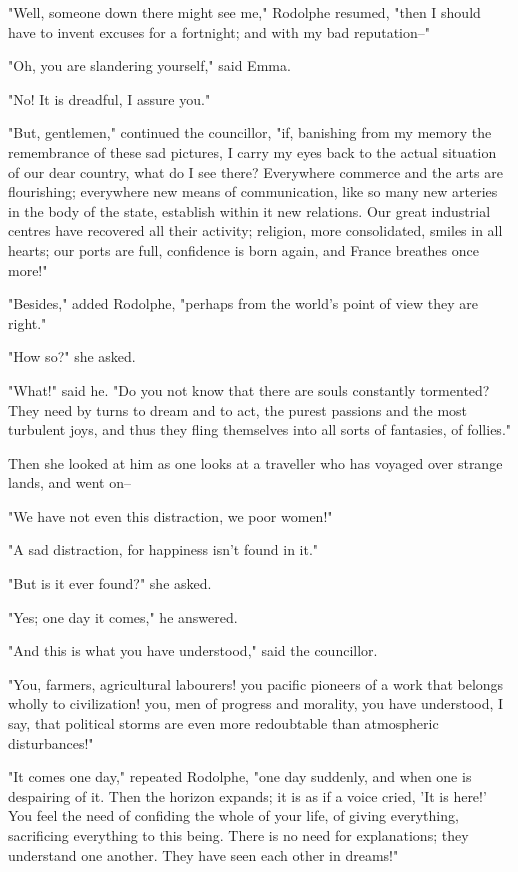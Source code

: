 \documentclass[11pt,twocolumn]{ltugboat}
\begin{document}
"Well, someone down there might see me," Rodolphe resumed, "then
I should have to invent excuses for a fortnight; and with my bad
reputation--"

"Oh, you are slandering yourself," said Emma.

"No! It is dreadful, I assure you."

"But, gentlemen," continued the councillor, "if, banishing from my
memory the remembrance of these sad pictures, I carry my eyes back
to the actual situation of our dear country, what do I see there?
Everywhere commerce and the arts are flourishing; everywhere new means
of communication, like so many new arteries in the body of the state,
establish within it new relations. Our great industrial centres have
recovered all their activity; religion, more consolidated, smiles in
all hearts; our ports are full, confidence is born again, and France
breathes once more!"

"Besides," added Rodolphe, "perhaps from the world's point of view they
are right."

"How so?" she asked.

"What!" said he. "Do you not know that there are souls constantly
tormented? They need by turns to dream and to act, the purest passions
and the most turbulent joys, and thus they fling themselves into all
sorts of fantasies, of follies."

Then she looked at him as one looks at a traveller who has voyaged over
strange lands, and went on--

"We have not even this distraction, we poor women!"

"A sad distraction, for happiness isn't found in it."

"But is it ever found?" she asked.

"Yes; one day it comes," he answered.

"And this is what you have understood," said the councillor.

"You, farmers, agricultural labourers! you pacific pioneers of a work
that belongs wholly to civilization! you, men of progress and morality,
you have understood, I say, that political storms are even more
redoubtable than atmospheric disturbances!"

"It comes one day," repeated Rodolphe, "one day suddenly, and when
one is despairing of it. Then the horizon expands; it is as if a voice
cried, 'It is here!' You feel the need of confiding the whole of your
life, of giving everything, sacrificing everything to this being. There
is no need for explanations; they understand one another. They have seen
each other in dreams!"
\end{document}
